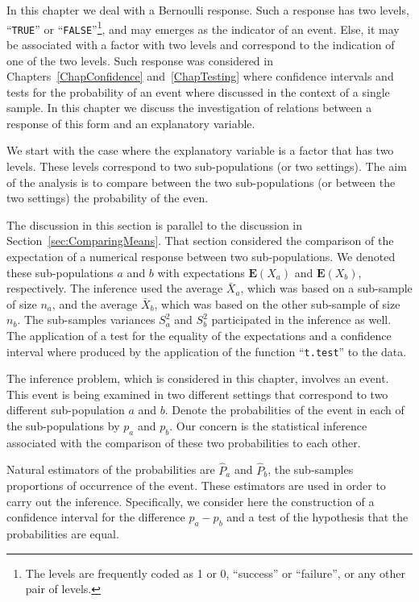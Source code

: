 \documentclass[
]{krantz}
\newcommand{\Expec}{\mathbf{E}}
\theoremstyle{definition}
\theoremstyle{definition}
\theoremstyle{definition}
\theoremstyle{remark}
\begin{document}
In this chapter we deal with a Bernoulli response. Such a response has
two levels, ``\texttt{TRUE}'' or ``\texttt{FALSE}''\footnote{The levels are frequently coded as 1 or 0, ``success'' or ``failure'',
  or any other pair of levels.}, and may emerges as the indicator
of an event. Else, it may be associated with a factor with two levels
and correspond to the indication of one of the two levels. Such response
was considered in Chapters~\ref{ChapConfidence} and~\ref{ChapTesting} where
confidence intervals and tests for the probability of an event where
discussed in the context of a single sample. In this chapter we discuss
the investigation of relations between a response of this form and an
explanatory variable.

We start with the case where the explanatory variable is a factor that
has two levels. These levels correspond to two sub-populations (or two
settings). The aim of the analysis is to compare between the two
sub-populations (or between the two settings) the probability of the
even.

The discussion in this section is parallel to the discussion in
Section~\ref{sec:ComparingMeans}. That section considered the comparison of
the expectation of a numerical response between two sub-populations. We
denoted these sub-populations \(a\) and \(b\) with expectations
\(\Expec(X_a)\) and \(\Expec(X_b)\), respectively. The inference used the
average \(\bar X_a\), which was based on a sub-sample of size \(n_a\), and
the average \(\bar X_b\), which was based on the other sub-sample of size
\(n_b\). The sub-samples variances \(S^2_a\) and \(S^2_b\) participated in the
inference as well. The application of a test for the equality of the
expectations and a confidence interval where produced by the application
of the function ``\texttt{t.test}'' to the data.

The inference problem, which is considered in this chapter, involves an
event. This event is being examined in two different settings that
correspond to two different sub-population \(a\) and \(b\). Denote the
probabilities of the event in each of the sub-populations by \(p_a\) and
\(p_b\). Our concern is the statistical inference associated with the
comparison of these two probabilities to each other.

Natural estimators of the probabilities are \(\hat P_a\) and \(\hat P_b\),
the sub-samples proportions of occurrence of the event. These estimators
are used in order to carry out the inference. Specifically, we consider
here the construction of a confidence interval for the difference
\(p_a - p_b\) and a test of the hypothesis that the probabilities are
equal.
\end{document}
